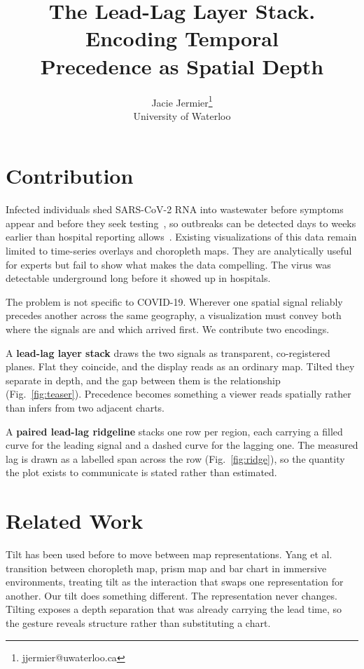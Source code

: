 \documentclass{vgtc}                %
\title{The Lead-Lag Layer Stack. Encoding Temporal\\ Precedence as Spatial Depth}
\author{Jacie Jermier\thanks{jjermier@uwaterloo.ca}\\ %
        \scriptsize University of Waterloo}
\begin{document}
\maketitle

\section{Contribution}

Infected individuals shed SARS-CoV-2 RNA into wastewater before symptoms appear
and before they seek testing~\cite{daoust2021,peccia2020}, so outbreaks can be
detected days to weeks earlier than hospital reporting
allows~\cite{kumar2022}. Existing visualizations of this data remain limited to
time-series overlays and choropleth maps. They are analytically useful for
experts but fail to show what makes the data compelling. The virus was detectable
underground long before it showed up in hospitals.

The problem is not specific to COVID-19. Wherever one spatial signal reliably
precedes another across the same geography, a visualization must convey both
where the signals are and which arrived first. We contribute two encodings.

A \textbf{lead-lag layer stack} draws the two signals as transparent,
co-registered planes. Flat they coincide, and the display reads as an ordinary
map. Tilted they separate in depth, and the gap between them is the relationship
(Fig.~\ref{fig:teaser}). Precedence becomes something a viewer reads spatially
rather than infers from two adjacent charts.

A \textbf{paired lead-lag ridgeline} stacks one row per region, each carrying a
filled curve for the leading signal and a dashed curve for the lagging one. The
measured lag is drawn as a labelled span across the row (Fig.~\ref{fig:ridge}),
so the quantity the plot exists to communicate is stated rather than estimated.

\section{Related Work}

Tilt has been used before to move between map representations. Yang et
al.~\cite{tiltmap} transition between choropleth map, prism map and bar chart in
immersive environments, treating tilt as the interaction that swaps one
representation for another. Our tilt does something different. The representation
never changes. Tilting exposes a depth separation that was already carrying the
lead time, so the gesture reveals structure rather than substituting a chart.
\end{document}
